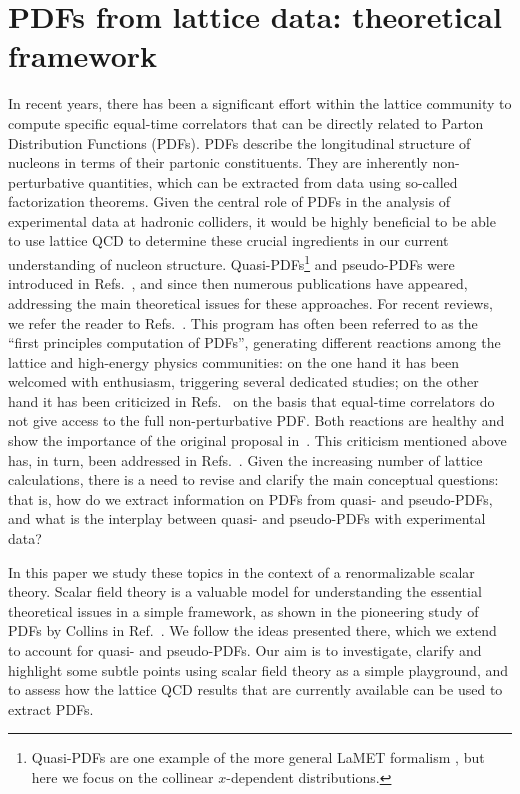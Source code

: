 \chapter{PDFs from lattice data: theoretical framework}
\label{ch:lattice}

In recent years, there has been a significant effort within the lattice
community to compute specific equal-time correlators that can be directly
related to Parton Distribution Functions (PDFs). PDFs describe the longitudinal
structure of nucleons in terms of their partonic constituents. They are
inherently non-perturbative quantities, which can be extracted from data using
so-called factorization theorems. Given the central role of PDFs in the analysis
of experimental data at hadronic colliders, it would be highly beneficial to be
able to use lattice QCD to determine these crucial ingredients in our current
understanding of nucleon structure. Quasi-PDFs\footnote{Quasi-PDFs are one example of the more general LaMET formalism \cite{Ji:2014gla,Ji:2020ect}, but here we focus on the collinear $x$-dependent distributions.} and pseudo-PDFs were introduced in
Refs.~\cite{PhysRevLett.110.262002, Radyushkin:2017cyf}, and since then numerous
publications have appeared, addressing the main theoretical issues for these
approaches. For recent reviews, we refer the reader to
Refs.~\cite{DelDebbio:2018siw,Monahan:2018euv,Zhao:2018fyu,Cichy:2018mum,
Radyushkin:2019mye,Ji:2020ect,Lin:2020rut}. This program has often been referred to as the ``first
principles computation of PDFs'', generating different reactions among the
lattice and high-energy physics communities: on the one hand it has been
welcomed with enthusiasm, triggering several dedicated studies; on the other
hand it has been criticized in Refs.~\cite{Rossi:2017muf,Rossi:2018zkn} on the
basis that equal-time correlators do not give access to the full
non-perturbative PDF. Both reactions are healthy and show the importance of the
original proposal in~\cite{PhysRevLett.110.262002}. This criticism mentioned
above has, in turn, been addressed in
Refs.~\cite{Radyushkin:2018nbf,Karpie:2018zaz}. Given the increasing number of
lattice calculations, there is a need to revise and clarify the main conceptual
questions: that is, how do we extract information on PDFs from quasi- and
pseudo-PDFs, and what is the interplay between quasi- and pseudo-PDFs with
experimental data?

In this paper we study these topics in the context of a renormalizable scalar
theory. Scalar field theory is a valuable model for understanding the essential
theoretical issues in a simple framework, as shown in the pioneering study of
PDFs by Collins in Ref.~\cite{Collins:1980ui}. We follow the ideas presented
there, which we extend to account for quasi- and pseudo-PDFs. Our aim is to
investigate, clarify and highlight some subtle points using scalar field theory
as a simple playground, and to assess how the lattice QCD results that are
currently available can be used to extract PDFs. 

